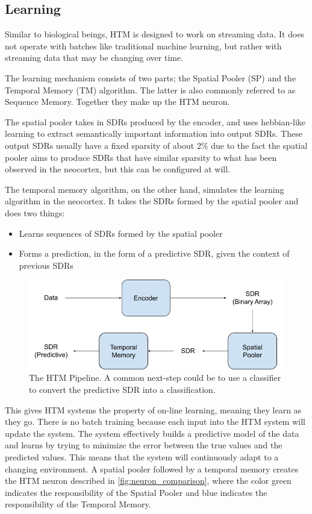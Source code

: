 \subsection{Learning}
Similar to biological beings, HTM is designed to work on streaming data. It does not operate with batches like traditional machine learning, but rather with streaming data that may be changing over time. \par
The learning mechanism consists of two parts; the Spatial Pooler (SP) and the Temporal Memory (TM) algorithm. The latter is also commonly referred to as Sequence Memory. Together they make up the HTM neuron.\par
The spatial pooler takes in SDRs produced by the encoder, and uses hebbian-like learning to extract semantically important information into output SDRs. These output SDRs usually have a fixed sparsity of about 2\% due to the fact the spatial pooler aims to produce SDRs that have similar sparsity to what has been observed in the neocortex, but this can be configured at will.\par
The temporal memory algorithm, on the other hand, simulates the learning algorithm in the neocortex. It takes the SDRs formed by the spatial pooler and does two things:
\begin{itemize}
    \item Learns sequences of SDRs formed by the spatial pooler
    \item Forms a prediction, in the form of a predictive SDR,  given the context of previous SDRs
\end{itemize}
\begin{figure}[H]
    \centering
    \includegraphics[width=\linewidth]{resources/related_works/htm_pipeline.png}
    \caption{The HTM Pipeline. A common next-step could be to use a classifier to convert the predictive SDR into a classification. }
    \label{fig:htm_pipeline}
\end{figure}

This gives HTM systems the property of on-line learning, meaning they learn as they go. There is no batch training because each input into the HTM system will update the system. The system effectively builds a predictive model of the data and learns by trying to minimize the error between the true values and the predicted values. This means that the system will continuously adapt to a changing environment. A spatial pooler followed by a temporal memory creates the HTM neuron described in \ref{fig:neuron_comparison}, where the color green indicates the responsibility of the Spatial Pooler and blue indicates the responsibility of the Temporal Memory.
